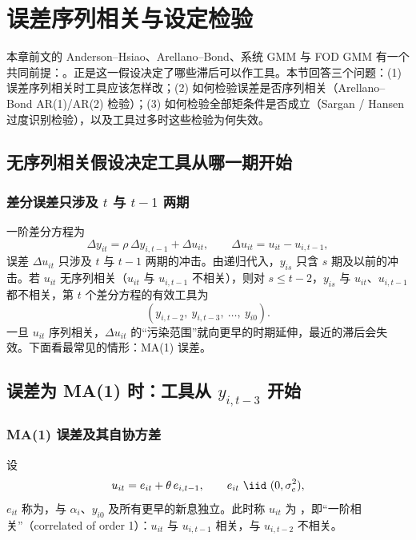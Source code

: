 \section{误差序列相关与设定检验}\label{sec:U12c-spec}

本章前文的 Anderson--Hsiao、Arellano--Bond、系统 GMM 与 FOD GMM 有一个共同前提：。正是这一假设决定了哪些滞后可以作工具。本节回答三个问题：(1) 误差序列相关时工具应该怎样改；(2) 如何检验误差是否序列相关（Arellano--Bond AR(1)/AR(2) 检验）；(3) 如何检验全部矩条件是否成立（Sargan / Hansen 过度识别检验），以及工具过多时这些检验为何失效。

\subsection{无序列相关假设决定工具从哪一期开始}

\subsubsection{差分误差只涉及 \texorpdfstring{$t$}{t} 与 \texorpdfstring{$t-1$}{t-1} 两期}

一阶差分方程为
\[
\Delta y_{it}=\rho\,\Delta y_{i,t-1}+\Delta u_{it},\qquad \Delta u_{it}=u_{it}-u_{i,t-1},
\]
误差 $\Delta u_{it}$ 只涉及 $t$ 与 $t-1$ 两期的冲击。由递归代入，$y_{is}$ 只含 $s$ 期及以前的冲击。若 $u_{it}$ 无序列相关（$u_{it}$ 与 $u_{i,t-1}$ 不相关），则对 $s\le t-2$，$y_{is}$ 与 $u_{it}$、$u_{i,t-1}$ 都不相关，第 $t$ 个差分方程的有效工具为
\[
(y_{i,t-2},\ y_{i,t-3},\ \dots,\ y_{i0}).
\]
一旦 $u_{it}$ 序列相关，$\Delta u_{it}$ 的“污染范围”就向更早的时期延伸，最近的滞后会失效。下面看最常见的情形：MA(1) 误差。

\subsection{误差为 MA(1) 时：工具从 \texorpdfstring{$y_{i,t-3}$}{y(i,t-3)} 开始}\label{sec:U12c-ma1}

\subsubsection{MA(1) 误差及其自协方差}

\begin{defn}[MA(1) 误差]
设
\[
u_{it}=e_{it}+\theta\,e_{i,t-1},\qquad e_{it}\ \iid\ (0,\sigma_e^2),
\]
$e_{it}$ 称为，与 $\alpha_i$、$y_{i0}$ 及所有更早的新息独立。此时称 $u_{it}$ 为 ，即“一阶相关”（correlated of order 1）：$u_{it}$ 与 $u_{i,t-1}$ 相关，与 $u_{i,t-2}$ 不相关。
\end{defn}

